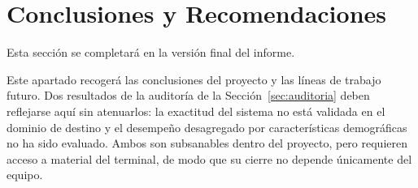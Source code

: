 %
%
\section{Conclusiones y Recomendaciones}
\label{sec:conclusiones}

Esta sección se completará en la versión final del informe.

Este apartado recogerá las conclusiones del proyecto y las líneas de
trabajo futuro. Dos resultados de la auditoría de la
Sección~\ref{sec:auditoria} deben reflejarse aquí sin atenuarlos: la
exactitud del sistema no está validada en el dominio de destino y el
desempeño desagregado por características demográficas no ha sido
evaluado. Ambos son subsanables dentro del proyecto, pero requieren
acceso a material del terminal, de modo que su cierre no depende
únicamente del equipo.
